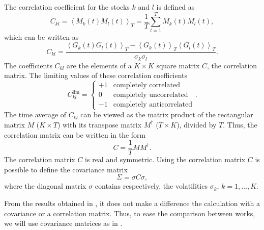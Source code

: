 The correlation coefficient for the stocks $k$ and $l$ is defined as
\cite{non_stationarity_fin_guhr}
\begin{equation}
    C_{kl} = \left\langle M_{k} \left( t \right) M_{l} \left( t \right)
    \right\rangle_{T} = \frac{1}{T} \sum_{t=1}^{T} M_{k} \left( t \right) M_{l}
    \left( t \right),
\end{equation}
which can be written as
\begin{equation}
    C_{kl} = \frac{\left\langle G_{k} \left( t \right) G_{l} \left( t \right)
    \right\rangle_{T} - \left\langle G_{k} \left( t \right) \right\rangle_{T}
    \left\langle G_{l} \left( t \right) \right\rangle_{T}}
    {\sigma_{k} \sigma_{l}}.
\end{equation}
The coefficients $C_{kl}$ are the elements of a $K \times K$ square matrix $C$,
the correlation matrix. The limiting values of these correlation coefficients
\begin{equation}
    C_{kl}^{\text{lim}} =
    \left\{
    \begin{array}{cc}
    +1 & \text{completely correlated}  \\
    0  & \text{completely uncorrelated}\\
    -1 & \text{completely anticorrelated}
    \end{array}
    \right. .
\end{equation}
The time average of $C_{kl}$ can be viewed as the matrix product of the
rectangular matrix $M$ ($K \times T$) with its transpose matrix $M^{\dagger}$
($T \times K$), divided by $T$. Thus, the correlation matrix can be written in
the form
\begin{equation}
    C = \frac{1}{T} M M^{\dagger}.
\end{equation}
The correlation matrix $C$ is real and symmetric. Using the correlation matrix
$C$ is possible to define the covariance matrix
\cite{exact_distributions_guhr,credit_risk_guhr,portfolio_distributions_guhr,asset_correlations_guhr,stochastic_cov_guhr}
\begin{equation}
    \Sigma = \sigma C \sigma ,
\end{equation}
where the diagonal matrix $\sigma$ contains respectively, the volatilities
$\sigma_{k}$, $k = 1, \ldots, K$.

From the results obtained in
\cite{non_stationarity_fin_guhr,portfolio_distributions_guhr}, it does not make
a difference the calculation with a covariance or a correlation matrix. Thus,
to ease the comparison between works, we will use covariance matrices as in
\cite{non_stationarity_fin_guhr}.


